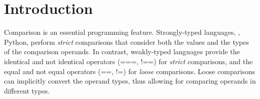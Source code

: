 \section{Introduction}
\label{lchecker:s:intro}
Comparison is an essential programming feature.
Strongly-typed languages, \eg{}, Python, perform \emph{strict} comparisons that consider both the values and the types of the comparison operands.
In contrast, weakly-typed languages provide the identical and not identical operators (===, !==) for \emph{strict} comparisons, and the equal and not equal operators (==, !=) for \emph{loose} comparisons.
Loose comparisons can implicitly convert the operand types, thus allowing for comparing operands in different types.

